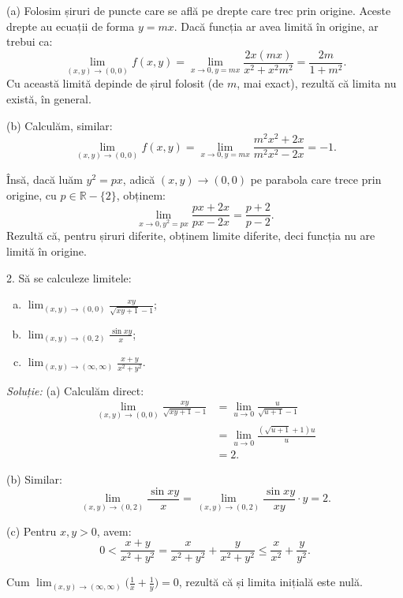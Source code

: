 \documentclass[11pt,a4paper]{article}
\newcommand\ds{\displaystyle}
\newcommand\RR{\mathbb{R}}
\theoremstyle{dotless}
\theoremstyle{dotlessdr}
\begin{document}
(a) Folosim șiruri de puncte care se află pe drepte care trec prin origine. Aceste drepte
au ecuații de forma $y = mx$. Dacă funcția ar avea limită în origine, ar trebui ca:
\[
  \lim_{(x, y) \to (0, 0)} f(x, y) = \lim_{x \to 0, y = mx} \frac{2x(mx)}{x^2 + x^2 m^2} = %
  \frac{2m}{1 + m^2}.
\]
Cu această limită depinde de șirul folosit (de $m$, mai exact), rezultă că limita nu
există, în general.

(b) Calculăm, similar:
\[
  \lim_{(x, y) \to (0, 0)} f(x, y) = %
  \lim_{x \to 0, y = mx} \frac{m^2 x^2 + 2x}{m^2 x^2 - 2x} = -1.
\]

Însă, dacă luăm $y^2 = px$, adică $(x, y) \to (0, 0)$ pe parabola care trece prin origine,
cu $p \in \RR - \{2 \}$, obținem:
\[
  \lim_{x \to 0, y^2 = px} \frac{px + 2x}{px - 2x} = \frac{p + 2}{p - 2}.
\]
Rezultă că, pentru șiruri diferite, obținem limite diferite, deci funcția nu are limită
în origine.

\vspace{1cm}

2. Să se calculeze limitele:
\begin{enumerate}[(a)]
\item $\ds\lim_{(x, y) \to (0, 0)} \frac{xy}{\sqrt{xy + 1} - 1}$;
\item $\ds\lim_{(x, y) \to (0, 2)} \frac{\sin xy}{x}$;
\item $\ds\lim_{(x, y) \to (\infty, \infty)} \frac{x + y}{x^2 + y^2}$.
\end{enumerate}

\emph{Soluție:} (a) Calculăm direct:
\begin{align*}
  \lim_{(x, y) \to (0, 0)} \frac{xy}{\sqrt{xy + 1} - 1} &= \lim_{u \to 0} \frac{u}{\sqrt{u + 1} - 1} \\
                                                        &= \lim_{u \to 0} \frac{(\sqrt{u + 1} + 1)u}{u}\\
                                                        &= 2.
\end{align*}

(b) Similar:
\[
  \lim_{(x, y) \to (0, 2)} \frac{\sin xy}{x} = \lim_{(x, y) \to (0, 2)} \frac{\sin xy}{xy} \cdot y = 2.
\]

(c) Pentru $x, y > 0$, avem:
\[
  0 < \frac{x + y}{x^2 + y^2} = \frac{x}{x^2 + y^2} + \frac{y}{x^2 + y^2} \leq \frac{x}{x^2} + \frac{y}{y^2}.
\]

Cum $\ds\lim_{(x, y) \to (\infty, \infty)} \Big( \frac{1}{x} + \frac{1}{y} \Big) = 0$, rezultă
că și limita inițială este nulă.
\end{document}
